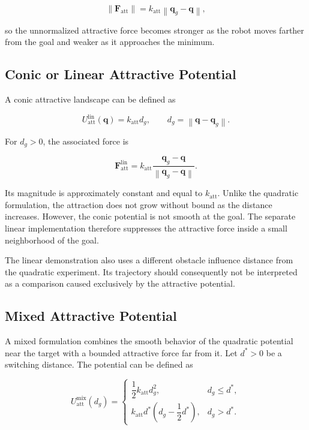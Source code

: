 \documentclass[10pt,twocolumn,a4paper]{article}
\begin{document}
\[
    \left\|\mathbf{F}_{\mathrm{att}}\right\|
    =
    k_{\mathrm{att}}
    \left\|\mathbf{q}_g-\mathbf{q}\right\|,
\]

so the unnormalized attractive force becomes stronger as the robot moves
farther from the goal and weaker as it approaches the minimum.

\subsection{Conic or Linear Attractive Potential}

A conic attractive landscape can be defined as

\begin{equation}
    U_{\mathrm{att}}^{\mathrm{lin}}(\mathbf{q})
    =
    k_{\mathrm{att}}d_g,
    \qquad
    d_g=\left\|\mathbf{q}-\mathbf{q}_g\right\|.
    \label{eq:linear_potential}
\end{equation}

For $d_g>0$, the associated force is

\begin{equation}
    \mathbf{F}_{\mathrm{att}}^{\mathrm{lin}}
    =
    k_{\mathrm{att}}
    \frac{\mathbf{q}_g-\mathbf{q}}
    {\left\|\mathbf{q}_g-\mathbf{q}\right\|}.
    \label{eq:linear_force}
\end{equation}

Its magnitude is approximately constant and equal to $k_{\mathrm{att}}$.
Unlike the quadratic formulation, the attraction does not grow without
bound as the distance increases. However, the conic potential is not smooth
at the goal. The separate linear implementation therefore suppresses the
attractive force inside a small neighborhood of the goal.

The linear demonstration also uses a different obstacle influence distance
from the quadratic experiment. Its trajectory should consequently not be
interpreted as a comparison caused exclusively by the attractive potential.

\subsection{Mixed Attractive Potential}

A mixed formulation combines the smooth behavior of the quadratic potential
near the target with a bounded attractive force far from it. Let $d^*>0$ be
a switching distance. The potential can be defined as

\begin{equation}
U_{\mathrm{att}}^{\mathrm{mix}}(d_g)
=
\begin{cases}
\dfrac{1}{2}k_{\mathrm{att}}d_g^2,
& d_g\leq d^*, \\

k_{\mathrm{att}}d^*
\left(d_g-\dfrac{1}{2}d^*\right),
& d_g>d^*.
\end{cases}
\label{eq:mixed_potential}
\end{equation}
\end{document}
